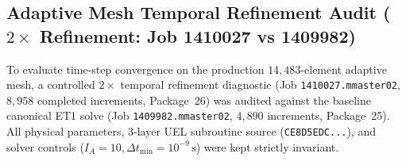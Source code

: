 \clearpage

\subsection{Adaptive Mesh Temporal Refinement Audit ($2\times$ Refinement: Job 1410027 vs 1409982)}
\label{sec:adaptive_temporal_refinement_audit}

To evaluate time-step convergence on the production $14{,}483$-element adaptive mesh, a controlled $2\times$ temporal refinement diagnostic (Job \texttt{1410027.mmaster02}, $8{,}958$ completed increments, Package~26) was audited against the baseline canonical ET1 solve (Job \texttt{1409982.mmaster02}, $4{,}890$ increments, Package~25). All physical parameters, 3-layer UEL subroutine source (\texttt{CE8D5EDC...}), and solver controls ($I_A=10, \Delta t_{\min}=10^{-9}\,\mathrm{s}$) were kept strictly invariant.

